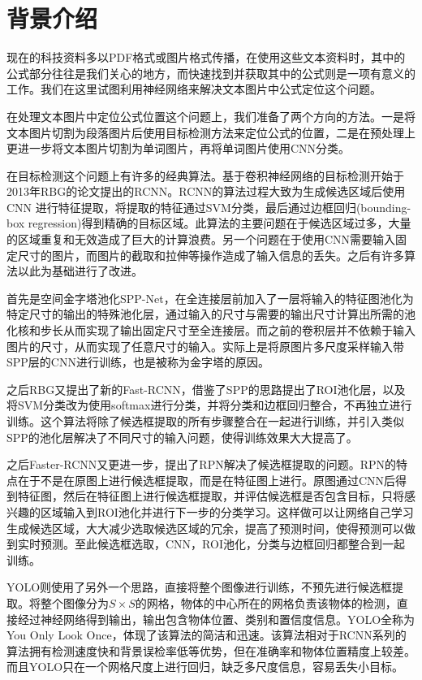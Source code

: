 
\chapter{背景介绍}

\noindent

现在的科技资料多以PDF格式或图片格式传播，在使用这些文本资料时，其中的公式部分往往是我们关心的地方，而快速找到并获取其中的公式则是一项有意义的工作。我们在这里试图利用神经网络来解决文本图片中公式定位这个问题。

在处理文本图片中定位公式位置这个问题上，我们准备了两个方向的方法。一是将文本图片切割为段落图片后使用目标检测方法来定位公式的位置，二是在预处理上更进一步将文本图片切割为单词图片，再将单词图片使用CNN分类。

在目标检测这个问题上有许多的经典算法。基于卷积神经网络的目标检测开始于2013年RBG的论文\parencite{rcnn}提出的RCNN。RCNN的算法过程大致为生成候选区域后使用 CNN 进行特征提取，将提取的特征通过SVM分类，最后通过边框回归(bounding-box regression)得到精确的目标区域。此算法的主要问题在于候选区域过多，大量的区域重复和无效造成了巨大的计算浪费。另一个问题在于使用CNN需要输入固定尺寸的图片，而图片的截取和拉伸等操作造成了输入信息的丢失。之后有许多算法以此为基础进行了改进。

首先是空间金字塔池化SPP-Net\parencite{spp}，在全连接层前加入了一层将输入的特征图池化为特定尺寸的输出的特殊池化层，通过输入的尺寸与需要的输出尺寸计算出所需的池化核和步长从而实现了输出固定尺寸至全连接层。而之前的卷积层并不依赖于输入图片的尺寸，从而实现了任意尺寸的输入。实际上是将原图片多尺度采样输入带SPP层的CNN进行训练，也是被称为金字塔的原因。

之后RBG又提出了新的Fast-RCNN\parencite{frcnn}，借鉴了SPP的思路提出了ROI池化层，以及将SVM分类改为使用softmax进行分类，并将分类和边框回归整合，不再独立进行训练。这个算法将除了候选框提取的所有步骤整合在一起进行训练，并引入类似SPP的池化层解决了不同尺寸的输入问题，使得训练效果大大提高了。

之后Faster-RCNN\parencite{ftrcnn}又更进一步，提出了RPN解决了候选框提取的问题。RPN的特点在于不是在原图上进行候选框提取，而是在特征图上进行。原图通过CNN后得到特征图，然后在特征图上进行候选框提取，并评估候选框是否包含目标，只将感兴趣的区域输入到ROI池化并进行下一步的分类学习。这样做可以让网络自己学习生成候选区域，大大减少选取候选区域的冗余，提高了预测时间，使得预测可以做到实时预测。至此候选框选取，CNN，ROI池化，分类与边框回归都整合到一起训练。

YOLO\parencite{yolo}则使用了另外一个思路，直接将整个图像进行训练，不预先进行候选框提取。将整个图像分为$S \times S$的网格，物体的中心所在的网格负责该物体的检测，直接经过神经网络得到输出，输出包含物体位置、类别和置信度信息。YOLO全称为You Only Look Once，体现了该算法的简洁和迅速。该算法相对于RCNN系列的算法拥有检测速度快和背景误检率低等优势，但在准确率和物体位置精度上较差。而且YOLO只在一个网格尺度上进行回归，缺乏多尺度信息，容易丢失小目标。

